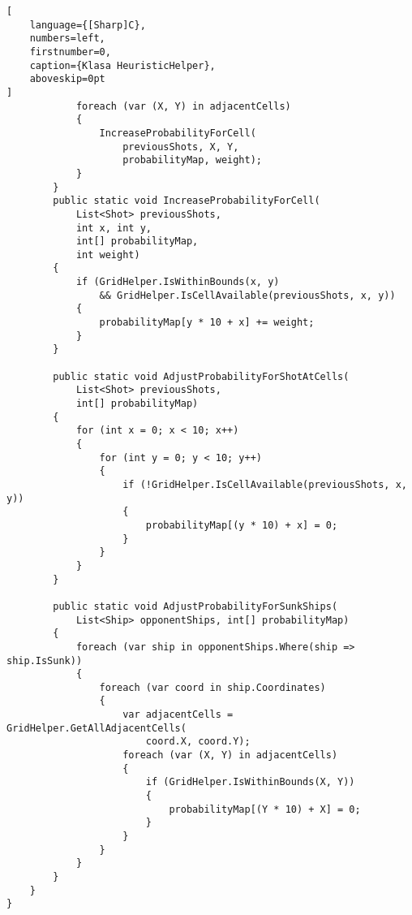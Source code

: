 \begin{addmargin}[0mm]{0mm}
\begin{lstlisting}[
    language={[Sharp]C},
    numbers=left,
    firstnumber=0,
    caption={Klasa HeuristicHelper},
    aboveskip=0pt
]
            foreach (var (X, Y) in adjacentCells)
            {
                IncreaseProbabilityForCell(
                    previousShots, X, Y,
                    probabilityMap, weight);
            }
        }
        public static void IncreaseProbabilityForCell(
            List<Shot> previousShots,
            int x, int y,
            int[] probabilityMap,
            int weight)
        {
            if (GridHelper.IsWithinBounds(x, y)
                && GridHelper.IsCellAvailable(previousShots, x, y))
            {
                probabilityMap[y * 10 + x] += weight;
            }
        }

        public static void AdjustProbabilityForShotAtCells(
            List<Shot> previousShots,
            int[] probabilityMap)
        {
            for (int x = 0; x < 10; x++)
            {
                for (int y = 0; y < 10; y++)
                {
                    if (!GridHelper.IsCellAvailable(previousShots, x, y))
                    {
                        probabilityMap[(y * 10) + x] = 0;
                    }
                }
            }
        }

        public static void AdjustProbabilityForSunkShips(
            List<Ship> opponentShips, int[] probabilityMap)
        {
            foreach (var ship in opponentShips.Where(ship => ship.IsSunk))
            {
                foreach (var coord in ship.Coordinates)
                {
                    var adjacentCells = GridHelper.GetAllAdjacentCells(
                        coord.X, coord.Y);
                    foreach (var (X, Y) in adjacentCells)
                    {
                        if (GridHelper.IsWithinBounds(X, Y))
                        {
                            probabilityMap[(Y * 10) + X] = 0;
                        }
                    }
                }
            }
        }
    }
}

\end{lstlisting}
\end{addmargin}